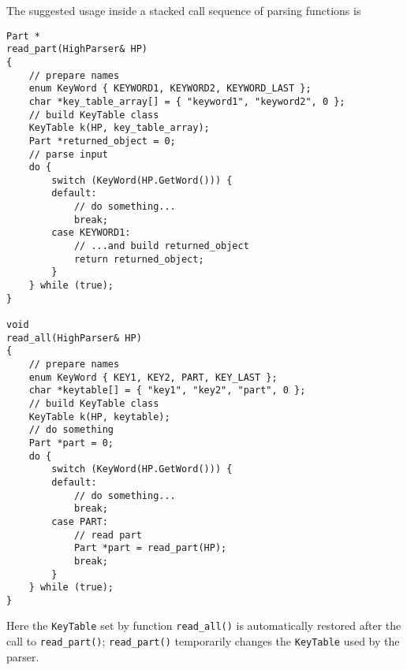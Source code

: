 \documentclass[10pt,fleqn,subeqn]{report}
\begin{document}
The suggested usage inside a stacked call sequence of parsing functions is
\begin{verbatim}
Part *
read_part(HighParser& HP)
{
    // prepare names
    enum KeyWord { KEYWORD1, KEYWORD2, KEYWORD_LAST };
    char *key_table_array[] = { "keyword1", "keyword2", 0 };
    // build KeyTable class
    KeyTable k(HP, key_table_array);
    Part *returned_object = 0;
    // parse input
    do {
        switch (KeyWord(HP.GetWord())) {
        default:
            // do something...
            break;
        case KEYWORD1:
            // ...and build returned_object
            return returned_object;
        }
    } while (true);
}

void
read_all(HighParser& HP)
{
    // prepare names
    enum KeyWord { KEY1, KEY2, PART, KEY_LAST };
    char *keytable[] = { "key1", "key2", "part", 0 };
    // build KeyTable class
    KeyTable k(HP, keytable);
    // do something
    Part *part = 0;
    do {
        switch (KeyWord(HP.GetWord())) {
        default:
            // do something...
            break;
        case PART:
            // read part
            Part *part = read_part(HP);
            break;
        }
    } while (true);
}

\end{verbatim}
Here the \texttt{KeyTable} set by function \texttt{read\_all()} 
is automatically restored after the call to \texttt{read\_part()}; 
\texttt{read\_part()} temporarily changes the \texttt{KeyTable}
used by the parser.
\end{document}
